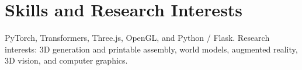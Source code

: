 \documentclass[a4paper,10pt]{article}
\begin{document}
\section*{Skills and Research Interests}
\par\smallskip
PyTorch, Transformers, Three.js, OpenGL, and Python / Flask. Research interests: 3D generation and printable assembly, world models, augmented reality, 3D vision, and computer graphics.
\end{document}
